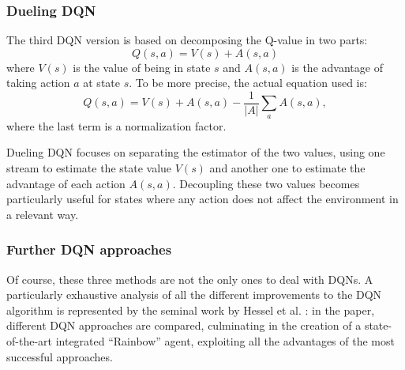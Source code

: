 \documentclass[a4paper, 12pt]{article}
\numberwithin{equation}{section}
\begin{document}
\subsubsection{Dueling DQN}

The third DQN version is based on decomposing the Q-value in two parts:
\begin{equation}
	Q\left(s,a\right)=V\left(s\right)+A\left(s,a\right)
\end{equation}
where $V\left(s\right)$ is the value of being in state $s$ and $A\left(s,a\right)$ is the advantage of taking action $a$ at state $s$. To be more precise, the actual equation used is:
\begin{equation}
	Q\left(s,a\right)=V\left(s\right)+A\left(s,a\right)-\frac{1}{\left|A\right|}\sum_aA\left(s,a\right),
\end{equation}
where the last term is a normalization factor.

Dueling DQN focuses on separating the estimator of the two values, using one stream to estimate the state value $V\left(s\right)$ and another one to estimate the advantage of each action $A\left(s,a\right)$. Decoupling these two values becomes particularly useful for states where any action does not affect the environment in a relevant way.




\subsubsection{Further DQN approaches}

Of course, these three methods are not the only ones to deal with DQNs. A particularly exhaustive analysis of all the different improvements to the DQN algorithm is represented by the seminal work by Hessel et al. \cite{rainbow}: in the paper, different DQN approaches are compared, culminating in the creation of a state-of-the-art integrated ``Rainbow'' agent, exploiting all the advantages of the most successful approaches.%


\end{document}

